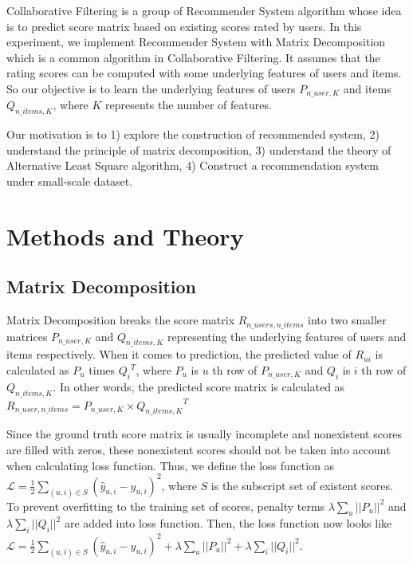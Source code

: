 \documentclass[journal, a4paper]{IEEEtran}
\begin{document}
Collaborative Filtering is a group of Recommender System algorithm whose idea is to predict score matrix based on existing scores rated by users.
In this experiment, we implement Recommender System with Matrix Decomposition which is a common algorithm in Collaborative Filtering.
It assumes that the rating scores can be computed with some underlying features of users and items.
So our objective is to learn the underlying features of users $P_{n\_user,K}$ and items $Q_{n\_items,K}$, where $K$ represents the number of features.

Our motivation is to 1) explore the construction of recommended system, 2) understand the principle of matrix decomposition, 3) understand the theory of Alternative Least Square algorithm, 4) Construct a recommendation system under small-scale dataset.
\section{Methods and Theory}
\subsection{Matrix Decomposition}
Matrix Decomposition breaks the score matrix $R_{n\_users,n\_items}$ into two smaller matrices $P_{n\_user,K}$ and $Q_{n\_items,K}$ representing the underlying features of users and items respectively.
When it comes to prediction, the predicted value of $R_{ui}$ is calculated as $P_u$ times ${Q_i}^T$, where $P_u$ is $u$ th row of $P_{n\_user,K}$ and $Q_i$ is $i$ th row of $Q_{n\_items,K}$.
In other words, the predicted score matrix is calculated as $R_{n\_user,n\_items}=P_{n\_user,K}\times {Q_{n\_items,K}}^T$

Since the ground truth score matrix is usually incomplete and nonexistent scores are filled with zeros, these nonexistent scores should not be taken into account when calculating loss function.
Thus, we define the loss function as $\mathcal{L}=\frac{1}{2}\sum\limits_{(u,i)\in{S}}{(\hat{y}_{u,i}-y_{u,i})^2}$, where $S$ is the subscript set of existent scores.
To prevent overfitting to the training set of scores, penalty terms $\lambda \sum\limits_u{||P_u||^2}$ and $\lambda \sum\limits_i{||Q_i||^2}$ are added into loss function.
Then, the loss function now looks like $\mathcal{L}=\frac{1}{2}\sum\limits_{(u,i)\in{S}}{(\hat{y}_{u,i}-y_{u,i})^2}+\lambda \sum\limits_u{||P_u||^2}+\lambda \sum\limits_i{||Q_i||^2}$.
\end{document}
